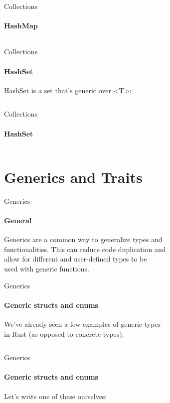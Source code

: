 \documentclass[usenames,dvipsnames,10pt,aspectratio=169]{beamer}
\begin{document}
\begin{frame}{Collections}
	\framesubtitle{HashMap}
	\large
	\inputminted[fontsize=\Large]{rust}{code/hashmap2.rs}
	\vspace{0.3cm}
\end{frame}

\begin{frame}{Collections}
	\framesubtitle{HashSet}
	\large
	HashSet is a set that's generic over <T>:
	\vspace{0.2cm}
	\inputminted[fontsize=\normalsize]{rust}{code/hashset.rs}
\end{frame}

\begin{frame}{Collections}
	\framesubtitle{HashSet}
	\large
	\inputminted[fontsize=\large]{rust}{code/hashset1.rs}
\end{frame}


\section{Generics and Traits}

\begin{frame}{Generics}
	\framesubtitle{General}
	\Large
	Generics are a common way to generalize types and\\
	functionalities. This can reduce code duplication and\\
	allow for different and user-defined types to be\\
	used with generic functions.\\
	\vspace{0.4cm}
\end{frame}

\begin{frame}{Generics}
	\framesubtitle{Generic structs and enums}
	\large
	We've already seen a few examples of generic types\\
	in Rust (as opposed to concrete types): 
	\vspace{0.2cm}
	\inputminted[fontsize=\large]{rust}{code/generics1.rs}
\end{frame}

\begin{frame}{Generics}
	\framesubtitle{Generic structs and enums}
	Let's write one of these ourselves:
	\vspace{0.2cm}
	\inputminted[fontsize=\large]{rust}{code/generics2.rs}
\end{frame}
\end{document}
